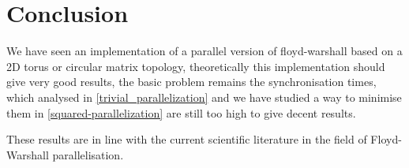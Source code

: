 \section{Conclusion}
We have seen an implementation of a parallel version of floyd-warshall based on a 2D torus or circular matrix topology, theoretically this implementation should give very good results, the basic problem remains the synchronisation times, which analysed in \cref{trivial_parallelization} and we have studied a way to minimise them in \cref{squared-parallelization} are still too high to give decent results.

These results are in line with the current scientific literature in the field of  Floyd-Warshall parallelisation.

\FloatBarrier